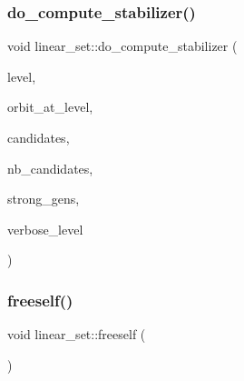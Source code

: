 \mbox{\label{classlinear__set_ae8f58ded28fb5370f4459cca42b7463b}} 
\subsubsection{\texorpdfstring{do\+\_\+compute\+\_\+stabilizer()}{do\_compute\_stabilizer()}}
{\footnotesize\ttfamily void linear\+\_\+set\+::do\+\_\+compute\+\_\+stabilizer (\begin{DoxyParamCaption}\item[{\mbox{\hyperlink{galois_8h_a09fddde158a3a20bd2dcadb609de11dc}{I\+NT}}}]{level,  }\item[{\mbox{\hyperlink{galois_8h_a09fddde158a3a20bd2dcadb609de11dc}{I\+NT}}}]{orbit\+\_\+at\+\_\+level,  }\item[{\mbox{\hyperlink{galois_8h_a09fddde158a3a20bd2dcadb609de11dc}{I\+NT}} $\ast$}]{candidates,  }\item[{\mbox{\hyperlink{galois_8h_a09fddde158a3a20bd2dcadb609de11dc}{I\+NT}}}]{nb\+\_\+candidates,  }\item[{\mbox{\hyperlink{classstrong__generators}{strong\+\_\+generators}} $\ast$\&}]{strong\+\_\+gens,  }\item[{\mbox{\hyperlink{galois_8h_a09fddde158a3a20bd2dcadb609de11dc}{I\+NT}}}]{verbose\+\_\+level }\end{DoxyParamCaption})}

\mbox{\label{classlinear__set_ae806af3cc0c8b5cd2a7d56937ed13229}} 
\subsubsection{\texorpdfstring{freeself()}{freeself()}}
{\footnotesize\ttfamily void linear\+\_\+set\+::freeself (\begin{DoxyParamCaption}{ }\end{DoxyParamCaption})}

\mbox{\label{classlinear__set_a7ab24e84423749047d5465cb15505475}} 

